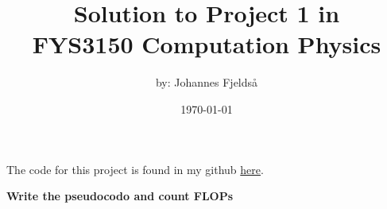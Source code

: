 \documentclass[final, 3p, times,11.5pt]{article}
\title{Solution to Project 1 in \\
\huge FYS3150 Computation Physics \\}
\author{by: Johannes Fjeldså}
\date{\today}
\begin{document}
\maketitle
\vspace{2 cm}
The code for this project is found in my github \href{https://github.com/Johannesfjeldsaa/FYS3150/tree/Project1}{here}.

\vspace{2 cm}
\begin{multicols}{2}  %
    \tableofcontents
\end{multicols}


\newpage


\newpage


\newpage


\newpage


\newpage


\newpage

\newpage
\textbf{Write the pseudocodo and count FLOPs}

\newpage


\newpage


\newpage

\end{document}
